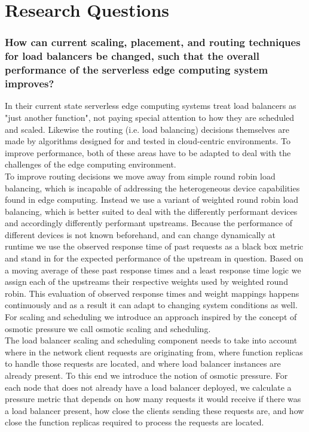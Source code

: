 \section{Research Questions}

\subsubsection{How can current scaling, placement, and routing techniques for load balancers be changed, such that the overall performance of the serverless edge computing system improves?}

In their current state serverless edge computing systems treat load balancers as "just another function", not paying special attention to how they are scheduled and scaled.
Likewise the routing (i.e. load balancing) decisions themselves are made by algorithms designed for and tested in cloud-centric environments.
To improve performance, both of these areas have to be adapted to deal with the challenges of the edge computing environment.\\
To improve routing decisions we move away from simple round robin load balancing, which is incapable of addressing the heterogeneous device capabilities found in edge computing.
Instead we use a variant of weighted round robin load balancing, which is better suited to deal with the differently performant devices and accordingly differently performant upstreams.
Because the performance of different devices is not known beforehand, and can change dynamically at runtime we use the observed response time of past requests as a black box metric and stand in for the expected performance of the upstream in question.
Based on a moving average of these past response times and a least response time logic we assign each of the upstreams their respective weights used by weighted round robin.
This evaluation of observed response times and weight mappings happens continuously and as a result it can adapt to changing system conditions as well.
For scaling and scheduling we introduce an approach inspired by the concept of osmotic pressure we call osmotic scaling and scheduling.\\
The load balancer scaling and scheduling component needs to take into account where in the network client requests are originating from, where function replicas to handle those requests are located, and where load balancer instances are already present.
To this end we introduce the notion of osmotic pressure.
For each node that does not already have a load balancer deployed, we calculate a pressure metric that depends on how many requests it would receive if there was a load balancer present, how close the clients sending these requests are, and how close the function replicas required to process the requests are located.
